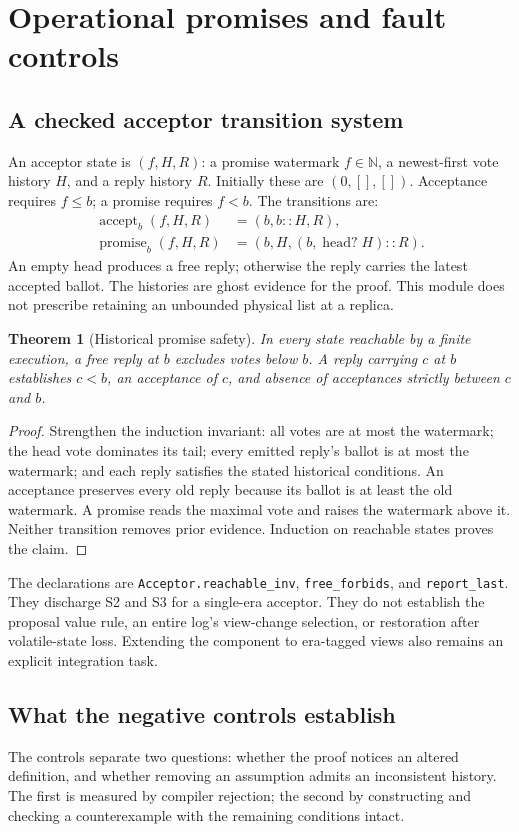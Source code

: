 \documentclass[10pt,journal,letterpaper]{IEEEtran}
\newtheorem{theorem}{Theorem}
\newcommand{\code}[1]{\texttt{\small #1}}
\begin{document}
\section{Operational promises and fault controls}\label{sec:operational}
\subsection{A checked acceptor transition system}
An acceptor state is $(f,H,R)$: a promise watermark $f\in\mathbb N$, a
newest-first vote history $H$, and a reply history $R$. Initially these are
$(0,[],[])$. Acceptance requires $f\le b$; a promise requires $f<b$.
The transitions are:
\begin{align*}
 \operatorname{accept}_b(f,H,R)&=(b,b::H,R),\\
 \operatorname{promise}_b(f,H,R)&=(b,H,(b,\operatorname{head?}H)::R).
\end{align*}
An empty head produces a free reply; otherwise the reply carries the latest
accepted ballot. The histories are ghost evidence for the proof. This module
does not prescribe retaining an unbounded physical list at a replica.

\begin{theorem}[Historical promise safety]
In every state reachable by a finite execution, a free reply at $b$ excludes
votes below $b$. A reply carrying $c$ at $b$ establishes $c<b$, an acceptance
of $c$, and absence of acceptances strictly between $c$ and $b$.
\end{theorem}
\begin{proof}
Strengthen the induction invariant: all votes are at most the watermark;
the head vote dominates its tail; every emitted reply's ballot is at most the
watermark; and each reply satisfies the stated historical conditions.
An acceptance preserves every old reply because its ballot is at least the
old watermark. A promise reads the maximal vote and raises the watermark
above it. Neither transition removes prior evidence. Induction on reachable
states proves the claim.
\end{proof}
The declarations are \code{Acceptor.reachable\_inv}, \code{free\_forbids},
and \code{report\_last}. They discharge S2 and S3 for a single-era acceptor.
They do not establish the proposal value rule, an entire log's view-change
selection, or restoration after volatile-state loss. Extending the component
to era-tagged views also remains an explicit integration task.

\subsection{What the negative controls establish}
The controls separate two questions: whether the proof notices an altered
definition, and whether removing an assumption admits an inconsistent history.
The first is measured by compiler rejection; the second by constructing and
checking a counterexample with the remaining conditions intact.
\end{document}
